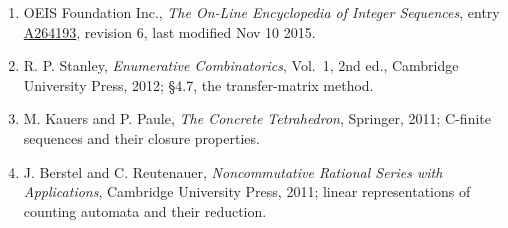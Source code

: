 \documentclass[11pt]{article}
\theoremstyle{definition}
\begin{document}
\begin{enumerate}

\item OEIS Foundation Inc., \emph{The On-Line Encyclopedia of Integer Sequences}, entry \href{https://oeis.org/A264193}{A264193}, revision 6, last modified Nov 10 2015.

\item R. P. Stanley, \emph{Enumerative Combinatorics}, Vol.~1, 2nd ed., Cambridge University Press, 2012; \S4.7, the transfer-matrix method.

\item M. Kauers and P. Paule, \emph{The Concrete Tetrahedron}, Springer, 2011; C-finite sequences and their closure properties.

\item J. Berstel and C. Reutenauer, \emph{Noncommutative Rational Series with Applications}, Cambridge University Press, 2011; linear representations of counting automata and their reduction.

\end{enumerate}
\end{document}
